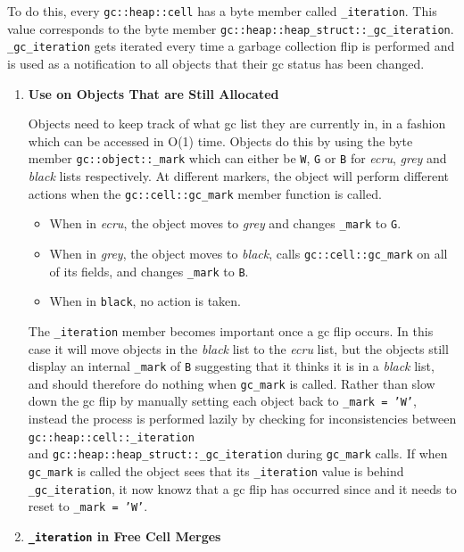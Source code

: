 \documentclass[11pt]{article}
\begin{document}
To do this, every \texttt{gc::heap::cell} has a byte member called \texttt{\_iteration}. This value corresponds to the 
byte member \texttt{gc::heap::heap\_struct::\_gc\_iteration}. \texttt{\_gc\_iteration} gets iterated every time a garbage collection
flip is performed and is used as a notification to all objects that their gc status has been changed.
\begin{enumerate}
\item \textbf{Use on Objects That are Still Allocated}

Objects need to keep track of what gc list they are currently in, in a fashion which can be accessed in
O(1) time. Objects do this by using the byte member \texttt{gc::object::\_mark} which can either be \texttt{W}, 
\texttt{G} or \texttt{B} for \textit{ecru}, \textit{grey} and \textit{black} lists respectively.
At different markers, the object will perform different actions when the \texttt{gc::cell::gc\_mark} member function is called.
\begin{itemize}
\item When in \textit{ecru}, the object moves to \textit{grey} and changes \texttt{\_mark} to \texttt{G}.
\item When in \textit{grey}, the object moves to \textit{black}, calls \texttt{gc::cell::gc\_mark} on all of its fields,
and changes \texttt{\_mark} to \texttt{B}.
\item When in \texttt{black}, no action is taken.
\end{itemize}
The \texttt{\_iteration} member becomes important once a gc flip occurs. In this case it will move objects in the \textit{black}
list to the \textit{ecru} list, but the objects still display an internal \texttt{\_mark} of \texttt{B} suggesting that it
thinks it is in a \textit{black} list, and should therefore do nothing when \texttt{gc\_mark} is called. Rather than slow down the gc flip
by manually setting each object back to \texttt{\_mark = 'W'}, instead the process is performed lazily by checking for inconsistencies
between \texttt{gc::heap::cell::\_iteration} \\
and \texttt{gc::heap::heap\_struct::\_gc\_iteration} during \texttt{gc\_mark} calls. If when \texttt{gc\_mark} is called the object sees
that its \texttt{\_iteration} value is behind \texttt{\_gc\_iteration}, it now knowz that a gc flip has occurred since and it needs to reset
to \texttt{\_mark = 'W'}.

\item \textbf{\texttt{\_iteration} in Free Cell Merges}


\end{enumerate}
\end{document}
